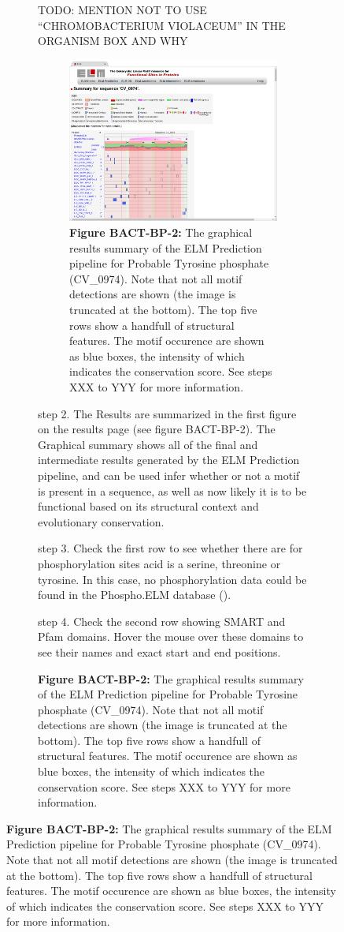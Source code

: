 {\begin{figure}[h!]
{{\begin{figure}[h!]
{{TODO: MENTION NOT TO USE ``CHROMOBACTERIUM VIOLACEUM'' IN THE ORGANISM
BOX AND WHY

\begin{figure}[h!]
\centering
\includegraphics[width=\textwidth]{Figures/BACT_1/elm_results_summary.png}
\caption{
\textbf{Figure BACT-BP-2:} The graphical results summary of the ELM
Prediction pipeline for Probable Tyrosine phosphate (CV\_0974). Note
that not all motif detections are shown (the image is truncated at the
bottom). The top five rows show a handfull of structural features. The
motif occurence are shown as blue boxes, the intensity of which
indicates the conservation score. See steps XXX to YYY for more
information.
}
\end{figure}

step 2. The Results are summarized in the first figure on the results
page (see figure BACT-BP-2). The Graphical summary shows all of the
final and intermediate results generated by the ELM Prediction pipeline,
and can be used infer whether or not a motif is present in a sequence,
as well as now likely it is to be functional based on its structural
context and evolutionary conservation.

step 3. Check the first row to see whether there are for phosphorylation
sites acid is a serine, threonine or tyrosine. In this case, no
phosphorylation data could be found in the Phospho.ELM database
(\cite{21062810}).

step 4. Check the second row showing SMART and Pfam domains. Hover the
mouse over these domains to see their names and exact start and end
positions.

}}
\end{figure}}}
\end{figure}}
